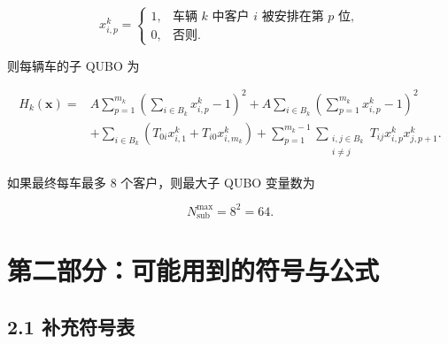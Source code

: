 \documentclass[
  a4paper,
]{ctexart}
\begin{document}
\[
x_{i,p}^{k}=\begin{cases}
1, & \text{车辆 }k\text{ 中客户 }i\text{ 被安排在第 }p\text{ 位},\\
0, & \text{否则}.
\end{cases}
\]

则每辆车的子 QUBO 为

\[
\begin{aligned}
H_k(\mathbf{x})=&
A\sum_{p=1}^{m_k}\left(\sum_{i\in B_k}x_{i,p}^{k}-1\right)^2
+A\sum_{i\in B_k}\left(\sum_{p=1}^{m_k}x_{i,p}^{k}-1\right)^2 \\
&+\sum_{i\in B_k}\left(T_{0i}x_{i,1}^{k}+T_{i0}x_{i,m_k}^{k}\right)
+\sum_{p=1}^{m_k-1}\sum_{\substack{i,j\in B_k\\ i\ne j}}T_{ij}x_{i,p}^{k}x_{j,p+1}^{k}.
\end{aligned}
\]

如果最终每车最多 \(8\) 个客户，则最大子 QUBO 变量数为

\[
N_{\mathrm{sub}}^{\max}=8^2=64.
\]

\section{第二部分：可能用到的符号与公式}\label{ux7b2cux4e8cux90e8ux5206ux53efux80fdux7528ux5230ux7684ux7b26ux53f7ux4e0eux516cux5f0f}

\subsection{2.1 补充符号表}\label{ux8865ux5145ux7b26ux53f7ux8868}
\end{document}
